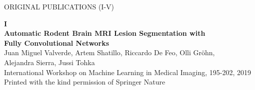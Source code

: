\documentclass[b5paper,12pt]{memoir}  %
\begin{document}
%
%
%

%
\cleardoublepage

%
\renewcommand{\contentsname}{CONTENTS} %
\tableofcontents*

%

%
%
%






\renewcommand{\bibsection}{\section*{\Large References}} %
\label{bibbib}
\renewcommand\bibpreamble{\vspace{1\baselineskip}} %
\setlength{\bibsep}{0pt} %



{\fontsize{11pt}{0}
}

%
%
%
%
%
%


\cleardoublepage

\begin{vplace}[0.7]
\centering
{\fontsize{16pt}{0}\selectfont ORIGINAL PUBLICATIONS (I-V)}
\end{vplace}

\cleardoublepage
\begin{vplace}[0.7]
\centering
\textbf{I} \\[1cm]

\textbf{Automatic Rodent Brain MRI Lesion Segmentation with \\ Fully Convolutional Networks}\\[1cm]

Juan Miguel Valverde, Artem Shatillo, Riccardo De Feo, Olli Gröhn, \\ Alejandra Sierra, Jussi Tohka \\[1cm]

International Workshop on Machine Learning in Medical Imaging, 195-202, 2019 \\[1cm]

Printed with the kind permission of Springer Nature
\end{vplace}
\end{document}

